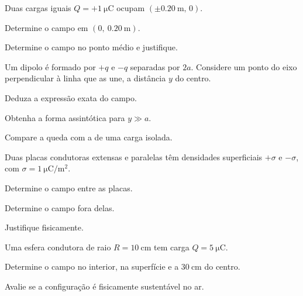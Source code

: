 \blocoaprofundamento
\begin{questao}[3]{}

Duas cargas iguais $Q=+\SI{1}{\micro\coulomb}$ ocupam
$(\pm\SI{0.20}{\meter},\,0)$.
\begin{itensq}
\item Determine o campo em $(0,\ \SI{0.20}{\meter})$.
\item Determine o campo no ponto médio e justifique.
\end{itensq}


\end{questao}
\begin{questao}[3]{}

Um dipolo é formado por $+q$ e $-q$ separadas por $2a$. Considere um ponto do
eixo perpendicular à linha que as une, a distância $y$ do centro.
\begin{itensq}
\item Deduza a expressão exata do campo.
\item Obtenha a forma assintótica para $y\gg a$.
\item Compare a queda com a de uma carga isolada.
\end{itensq}


\end{questao}
\begin{questao}[3]{}

Duas placas condutoras extensas e paralelas têm densidades superficiais
$+\sigma$ e $-\sigma$, com
$\sigma=\SI{1}{\micro\coulomb\per\meter\squared}$.
\begin{itensq}
\item Determine o campo entre as placas.
\item Determine o campo fora delas.
\item Justifique fisicamente.
\end{itensq}


\end{questao}
\begin{questao}[3]{}

Uma esfera condutora de raio $R=\SI{10}{\centi\meter}$ tem carga
$Q=\SI{5}{\micro\coulomb}$.
\begin{itensq}
\item Determine o campo no interior, na superfície e a $\SI{30}{\centi\meter}$
      do centro.
\item Avalie se a configuração é fisicamente sustentável no ar.
\end{itensq}


\end{questao}
